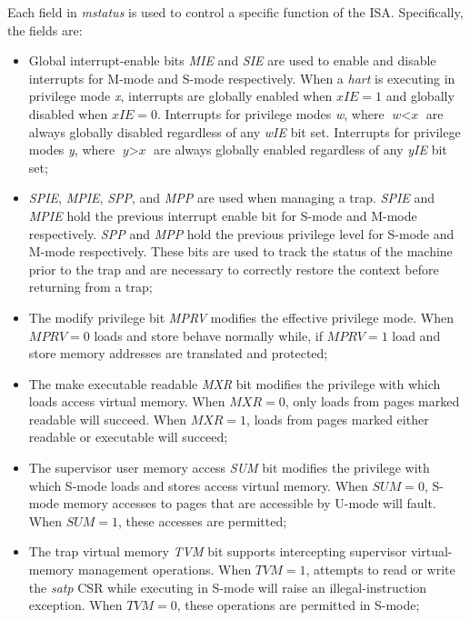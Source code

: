 Each field in \textit{mstatus} is used to control a specific function of the ISA.
Specifically, the fields are:
\begin{itemize}
  \item Global interrupt-enable bits \textit{MIE} and \textit{SIE} are used to enable
    and disable interrupts for M-mode and S-mode respectively. When a \textit{hart}
    is executing in privilege mode \textit{x}, interrupts are globally enabled when
    $\textit{xIE}= 1$ and globally disabled when $\textit{xIE}= 0$. Interrupts
    for privilege modes \textit{w}, where $\textit{w}< \textit{x}$ are always
    globally disabled regardless of any \textit{wIE} bit set. Interrupts for
    privilege modes \textit{y}, where $\textit{y}> \textit{x}$ are always
    globally enabled regardless of any \textit{yIE} bit set;

  \item \textit{SPIE}, \textit{MPIE}, \textit{SPP}, and \textit{MPP} are used
    when managing a trap. \textit{SPIE} and \textit{MPIE} hold the previous interrupt
    enable bit for S-mode and M-mode respectively. \textit{SPP} and \textit{MPP}
    hold the previous privilege level for S-mode and M-mode respectively. These bits
    are used to track the status of the machine prior to the trap and are necessary
    to correctly restore the context before returning from a trap;

  \item The modify privilege bit \textit{MPRV} modifies the effective privilege
    mode. When $\textit{MPRV}= 0$ loads and store behave normally while, if
    $\textit{MPRV}= 1$ load and store memory addresses are translated and
    protected;

  \item The make executable readable \textit{MXR} bit modifies the privilege
    with which loads access virtual memory. When $\textit{MXR}=0$, only loads
    from pages marked readable will succeed. When $\textit{MXR}=1$, loads from
    pages marked either readable or executable will succeed;

  \item The supervisor user memory access \textit{SUM} bit modifies the
    privilege with which S-mode loads and stores access virtual memory. When $\textit
    {SUM}=0$, S-mode memory accesses to pages that are accessible by U-mode will
    fault. When $\textit{SUM}=1$, these accesses are permitted;

  \item The trap virtual memory \textit{TVM} bit supports intercepting
    supervisor virtual-memory management operations. When $\textit{TVM}=1$,
    attempts to read or write the \textit{satp} CSR while executing in S-mode will
    raise an illegal-instruction exception. When $\textit{TVM}=0$, these operations
    are permitted in S-mode;


\end{itemize}
